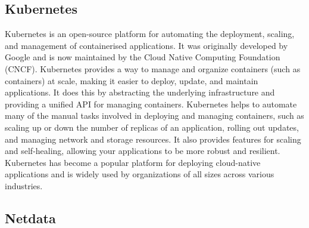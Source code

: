  \subsection{Kubernetes}
  \label{sec:kubernetes-third-party}
    Kubernetes \cite{the-linux-foundationKubernetesDocumentationGetting} is an open-source platform for automating the deployment, scaling, and management of containerised applications. It was originally developed by Google and is now maintained by the Cloud Native Computing Foundation (CNCF).
    Kubernetes provides a way to manage and organize containers (such as  containers) at scale, making it easier to deploy, update, and maintain applications. It does this by abstracting the underlying infrastructure and providing a unified API for managing containers.
    Kubernetes helps to automate many of the manual tasks involved in deploying and managing containers, such as scaling up or down the number of replicas of an application, rolling out updates, and managing network and storage resources. It also provides features for scaling and self-healing, allowing your applications to be more robust and resilient.
    Kubernetes has become a popular platform for deploying cloud-native applications and is widely used by organizations of all sizes across various industries.

    \subsection{Netdata}
    \label{sec:netdata-third-party}

